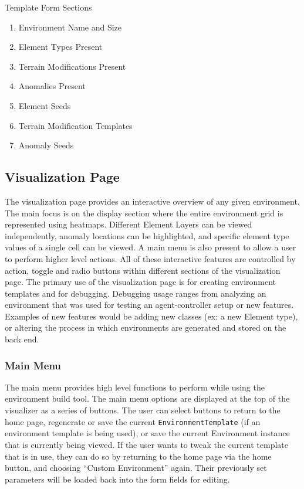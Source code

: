 Template Form Sections
\begin{enumerate}
  \item Environment Name and Size
  \item Element Types Present
  \item Terrain Modifications Present
  \item Anomalies Present
  \item Element Seeds
  \item Terrain Modification Templates
  \item Anomaly Seeds
\end{enumerate}


\subsection{Visualization Page} \label{subsec:visualization_page}
The visualization page provides an interactive overview of any given environment.
The main focus is on the display section where the entire environment grid is represented using heatmaps.
Different Element Layers can be viewed independently, anomaly locations can be highlighted, and specific element type values of a single cell can be viewed.
A main menu is also present to allow a user to perform higher level actions.
All of these interactive features are controlled by action, toggle and radio buttons within different sections of the visualization page.
The primary use of the visualization page is for creating environment templates and for debugging.
Debugging usage ranges from analyzing an environment that was used for testing an agent-controller setup or new features.
Examples of new features would be adding new classes (ex: a new Element type), or altering the process in which environments are generated and stored on the back end.


\subsubsection{Main Menu}
The main menu provides high level functions to perform while using the environment build tool.
The main menu options are displayed at the top of the visualizer as a series of buttons.
The user can select buttons to return to the home page, regenerate or save the current \texttt{EnvironmentTemplate} (if an environment template is being used), or save the current Environment instance that is currently being viewed.
If the user wants to tweak the current template that is in use, they can do so by returning to the home page via the home button, and choosing ``Custom Environment'' again.
Their previously set parameters will be loaded back into the form fields for editing.


